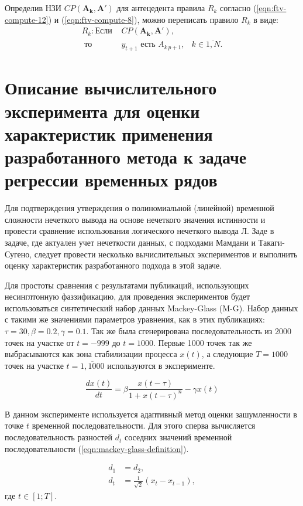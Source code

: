 Определив НЗИ $CP(\mathbf{A_{k}, \mathbf{A'}})$ для антецедента правила $R_k$ согласно (\ref{eqn:ftv-compute-12}) и (\ref{eqn:ftv-compute-8}), можно переписать правило $R_k$ в виде:
\begin{align*}
	R_k: \textrm{Если }&CP(\mathbf{A_{k}, \mathbf{A'}}),&\\
	\textrm{ то }&y_{t+1}\textrm{ есть }A_{k\,p+1},&k\in\overline{1,N}.
\end{align*}


\section{Описание вычислительного эксперимента для оценки характеристик применения разработанного метода к задаче регрессии временных рядов}

Для подтверждения утверждения о полиномиальной (линейной) временной сложности нечеткого вывода на основе нечеткого значения истинности и провести сравнение использования логического нечеткого вывода Л. Заде в задаче, где актуален учет нечеткости данных, с подходами Мамдани и Такаги-Сугено, следует провести несколько вычислительных экспериментов и выполнить оценку характеристик разработанного подхода в этой задаче.

Для простоты сравнения с результатами публикаций, использующих несинглтонную фаззификацию, для проведения экспериментов будет использоваться синтетический набор данных Mackey-Glass (M-G). Набор данных с такими же значениями параметров уравнения, как в этих публикациях: $\tau = 30, \beta = 0.2, \gamma = 0.1$. Так же была сгенерирована последовательность из 2000 точек на участке от $t=-999$ до $t=1000$. Первые 1000 точек так же выбрасываются как зона стабилизации процесса $x(t)$, а следующие $T=1000$ точек на участке $t=\overline{1,1000}$ используются в эксперименте.

\begin{equation}
	\frac{dx(t)}{dt} = \beta\frac{x(t-\tau)}{1+x(t-\tau)^n}-\gamma x(t)
	\label{eqn:mackey-glass-definition}
\end{equation}


В данном эксперименте используется адаптивный метод оценки зашумленности в точке $t$ временной последовательности. Для этого сперва вычисляется последовательность разностей $d_t$ соседних значений временной последовательности (\ref{eqn:mackey-glass-definition}).

\begin{align}
	\label{eqn:mackey-glass-seq-diff}
	d_1 &= d_2, \\
	d_t &= \frac{1}{\sqrt{2}}(x_t - x_{t-1}),
\end{align}
где $t\in[1;T]$.

